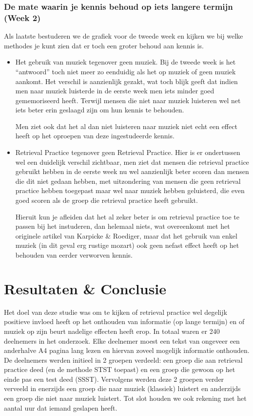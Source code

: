 \documentclass{hogent-article}
\begin{document}
\subsubsection{De mate waarin je kennis behoud op iets langere termijn (Week 2)}

Als laatste bestuderen we de grafiek voor de tweede week en kijken we bij welke methodes je kunt zien dat er toch een groter behoud aan kennis is.


\begin{itemize}
    \item Het gebruik van muziek tegenover geen muziek. Bij de tweede week is het “antwoord” toch niet meer zo eenduidig als het op muziek of geen muziek aankomt. Het verschil is aanzienlijk gezakt, wat toch blijk geeft dat indien men naar muziek luisterde in de eerste week men iets minder goed gememoriseerd heeft. Terwijl mensen die niet naar muziek luisteren wel net iets beter erin geslaagd zijn om hun kennis te behouden.
    
    Men ziet ook dat het al dan niet luisteren naar muziek niet echt een effect heeft op het oproepen van deze ingestudeerde kennis.
    
    \item Retrieval Practice tegenover geen Retrieval Practice. Hier is er ondertussen wel een duidelijk verschil zichtbaar, men ziet dat mensen die retrieval practice gebruikt hebben in de eerste week nu wel aanzienlijk beter scoren dan mensen die dit niet gedaan hebben, met uitzondering van mensen die geen retrieval practice hebben toegepast maar wel naar muziek hebben geluisterd, die even goed scoren als de groep die retrieval practice heeft gebruikt. 
    
    Hieruit kun je afleiden dat het al zeker beter is om retrieval practice toe te passen bij het instuderen, dan helemaal niets, wat overeenkomt met het originele artikel van Karpicke \& Roediger, maar dat het gebruik van enkel muziek (in dit geval erg rustige mozart) ook geen nefast effect heeft op het behouden van eerder verworven kennis.
    
\end{itemize}
    

\section{Resultaten \& Conclusie }

Het doel van deze studie was om te kijken of retrieval practice wel degelijk positieve invloed heeft op het onthouden van informatie (op lange termijn) en of muziek op zijn beurt nadelige effecten heeft erop. In totaal waren er 240 deelnemers in het onderzoek. Elke deelnemer moest een tekst van ongeveer een anderhalve A4 pagina lang lezen en hiervan zoveel mogelijk informatie onthouden. De deelnemers werden initieel in 2 groepen verdeeld: een groep die aan retrieval practice deed (en de methode STST toepast) en een groep die gewoon op het einde pas een test deed (SSST). Vervolgens werden deze 2 groepen verder verveeld in enerzijds een groep die naar muziek (klassiek) luistert en anderzijds een groep die niet naar muziek luistert. Tot slot houden we ook rekening met het aantal uur dat iemand geslapen heeft.
\end{document}
